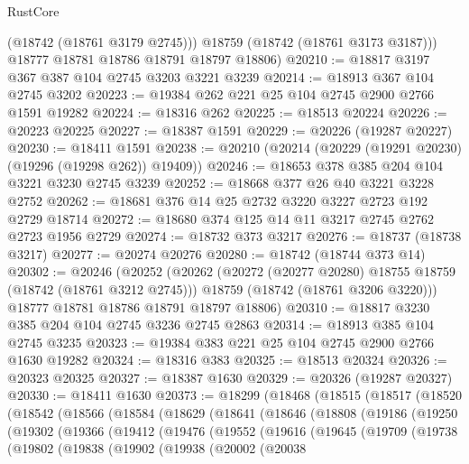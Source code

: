 \begin{lexlean}{RustCore}
\begin{coremodule}
          (@18742 (@18761 @3179 @2745)))
        @18759
        (@18742 (@18761 @3173 @3187)))
      @18777
      @18781
      @18786
      @18791
      @18797
      @18806)
@20210 := @18817 @3197 @367 @387 @104 @2745 @3203 @3221 @3239
@20214 := @18913 @367 @104 @2745 @3202
@20223 := @19384 @262 @221 @25 @104 @2745 @2900 @2766 @1591 @19282
@20224 := @18316 @262
@20225 := @18513 @20224
@20226 := @20223 @20225
@20227 := @18387 @1591
@20229 := @20226 (@19287 @20227)
@20230 := @18411 @1591
@20238 := @20210 (@20214 (@20229 (@19291 @20230) (@19296 (@19298 @262)) @19409))
@20246 := @18653 @378 @385 @204 @104 @3221 @3230 @2745 @3239
@20252 := @18668 @377 @26 @40 @3221 @3228 @2752
@20262 := @18681 @376 @14 @25 @2732 @3220 @3227 @2723 @192 @2729 @18714
@20272 := @18680 @374 @125 @14 @11 @3217 @2745 @2762 @2723 @1956 @2729
@20274 := @18732 @373 @3217
@20276 := @18737 (@18738 @3217)
@20277 := @20274 @20276
@20280 := @18742 (@18744 @373 @14)
@20302 := @20246
    (@20252
      (@20262
        (@20272 (@20277 @20280) @18755 @18759 (@18742 (@18761 @3212 @2745)))
        @18759
        (@18742 (@18761 @3206 @3220)))
      @18777
      @18781
      @18786
      @18791
      @18797
      @18806)
@20310 := @18817 @3230 @385 @204 @104 @2745 @3236 @2745 @2863
@20314 := @18913 @385 @104 @2745 @3235
@20323 := @19384 @383 @221 @25 @104 @2745 @2900 @2766 @1630 @19282
@20324 := @18316 @383
@20325 := @18513 @20324
@20326 := @20323 @20325
@20327 := @18387 @1630
@20329 := @20326 (@19287 @20327)
@20330 := @18411 @1630
@20373 := @18299
    (@18468
      (@18515
        (@18517
          (@18520
            (@18542
              (@18566
                (@18584
                  (@18629
                    (@18641
                      (@18646
                        (@18808
                          (@19186
                            (@19250
                              (@19302
                                (@19366
                                  (@19412
                                    (@19476
                                      (@19552
                                        (@19616
                                          (@19645
                                            (@19709
                                              (@19738
                                                (@19802
                                                  (@19838
                                                    (@19902
                                                      (@19938
                                                        (@20002
                                                          (@20038

\end{coremodule}
\end{lexlean}
